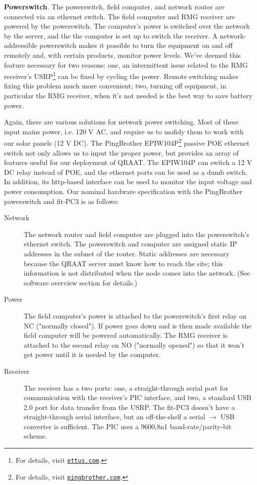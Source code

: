 \documentclass[letter]{article}
\newcounter{foot}
\begin{document}
\textbf{Powerswitch}. The powerswitch, field computer,
and network router are connected via an ethernet switch. The field computer and RMG 
receiver are powered by the powerswitch. The computer's power is switched over the 
network by the server, and the the computer is set up to switch the receiver. 
A network-addressible powerswitch makes it possible to turn the equipment on and off
remotely and, with certain products, monitor power levels. We've deemed this feature 
necessary for two reasons: one, an intermittent issue related to 
the RMG receiver's USRP\footnote{For details, visit
\href{https://www.ettus.com}{\tt ettus.com}.} can be fixed by 
cycling the power. Remote switching makes fixing this problem much more convenient; 
two, turning off equipment, in particular the   
RMG receiver, when it's not needed is the best way to save battery power.

Again, there are various solutions for network power switching. Most of these input 
mains power, i.e. 120 V AC, and require us to mofidy them to work with our solar 
panels (12 V DC). The PingBrother EPIW104P\footnote{For details, visit
\href{http://www.pingbrother.com}{\tt pingbrother.com}.} passive POE ethernet switch 
not only allows us to input the proper power, but provides an array of features 
uesful for our deployment of QRAAT. The EPIW104P can switch a 12 V DC relay instead of
POE, and the ethernet ports can be used as a dumb switch. In addition, its http-based 
interface can be used to monitor the input voltage and power consumption. Our nominal 
hardware specification with the PingBrother powerswitch and fit-PC3 is as follows: 

\begin{description}
  \item[\quad Network] The network router and field computer are plugged into the 
    powerswitch's ethernet switch. The powerswitch and computer are assigned static
    IP addresses in the subnet of the router. Static addresses are necessary because 
    the QRAAT server must know how to reach the site; this information is not 
    distributed when the node comes into the network. (See software overview section 
    for details.) 
    
  \item[\quad Power] The field computer's power is attached to the powerswitch's 
    first relay on NC ("normally closed"). If power goes down and is then made 
    available the field computer will be powered automatically. The RMG receiver is
    attached to the second relay on NO ("normally opened") so that it won't get power 
    until it is needed by the computer. 
    
  \item[\quad Receiver] The receiver has a two ports: one, a straight-through serial 
    port for communication with the receiver's PIC interface, and two, a standard USB
    2.0 port for data transfer from the USRP. The fit-PC3 doesn't have a straight-through
    serial interface, but an off-the-shelf a serial $\rightarrow$ USB converter is 
    sufficient. The PIC uses a 9600,8n1 baud-rate/parity-bit scheme.  
\end{description}
 
\end{document}
